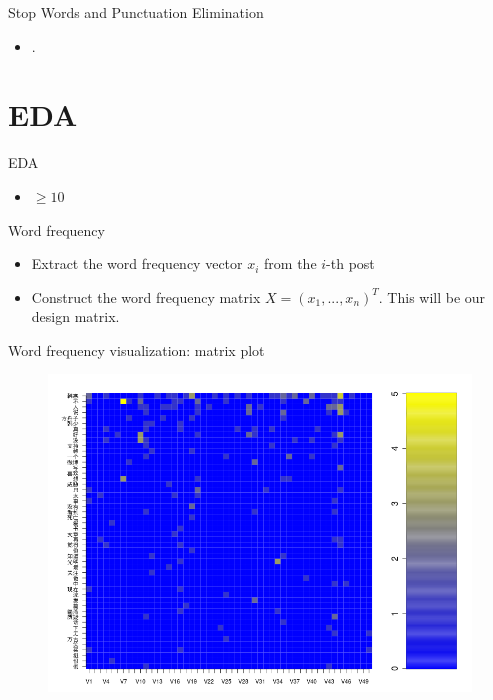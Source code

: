 \documentclass[12pt, trans]{beamer}
\newcommand{\1}[1]{{\mathbf 1}\left\{#1\right\}}        %
\begin{document}
\begin{frame}{Stop Words and Punctuation Elimination}

\begin{itemize}[<+->]
\item .
\end{itemize}

\end{frame}



\section{EDA}

\begin{frame}{EDA}

\begin{itemize}[<+->]
\item $\geq 10$
\end{itemize}

\end{frame}



\begin{frame}{Word frequency}
\begin{itemize}[<+->]
\item Extract the word frequency vector $x_i$ from the $i$-th post
\item Construct the word frequency matrix $X=(x_1,...,x_n)^T$. This will be our design matrix.
\end{itemize}
\end{frame}


\begin{frame}{Word frequency visualization: matrix plot}

\begin{figure}
  \centering
  \includegraphics[height=0.9\textheight]{./../../wordFreqMat.png} 
\end{figure}


\end{frame}
\end{document}
